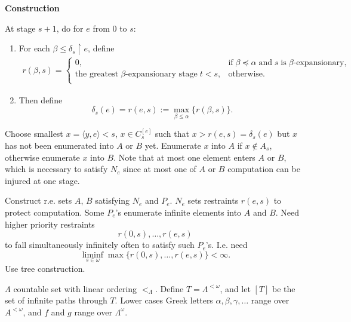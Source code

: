  \textbf{Construction}
  \begin{tcolorbox}
    At stage $s+1$, do for $e$ from 0 to $s$:
    \begin{enumerate}
      \item For each $\beta\leq \delta_s\restriction e$, define
        \begin{align*}
          r(\beta,s) =
          \begin{cases}
            0, &\text{if}\; \beta\preceq\alpha\; \text{and}\; s\;
              \text{is}\; \beta\text{-expansionary},\\
            \text{the greatest}\; \beta\text{-expansionary stage}\; t<s,
              &\text{otherwise}.\\
          \end{cases}
        \end{align*}
      \item Then define
        \[\delta_s(e) =r(e,s) :=\max_{\beta\leq\alpha}\{r(\beta,s)\}.\]
    \end{enumerate}

    Choose smallest $x=\langle y,e\rangle<s$, $x\in C_s^{[e]}$ such
    that $x>r(e,s)=\delta_s(e)$ but $x$ has not been enumerated into
    $A$ or $B$ yet. Enumerate $x$ into $A$ if $x\not\in A_s$, otherwise
    enumerate $x$ into $B$. Note that at most one element enters $A$ or
    $B$, which is necessary to satisfy $N_e$ since at most one of $A$ or
    $B$ computation can be injured at one stage.
  \end{tcolorbox}

  Construct r.e. sets $A$, $B$ satisfying $N_e$ and $P_e$. $N_e$ sets
  restraints $r(e,s)$ to protect computation. Some $P_e$'s enumerate
  infinite elements into $A$ and $B$. Need higher priority restraints
  \[r(0,s),\ldots,r(e,s)\]
  to fall simultaneously infinitely often to satisfy such $P_e$'s. I.e.
  need
  \begin{equation}
    \liminf_{s\in\omega} \max\{r(0,s),\ldots,r(e,s)\} <\infty.
    \label{eqn:liminf}
  \end{equation}
  Use tree construction.

  \begin{definition}
    $\Lambda$ countable set with linear ordering $<_\Lambda$. Define
    $T=\Lambda^{<\omega}$, and let $[T]$ be the set of infinite paths
    through $T$. Lower cases Greek letters $\alpha,\beta,\gamma,\ldots$
    range over $A^{<\omega}$, and $f$ and $g$ range over $\Lambda^\omega$.
  \end{definition}

